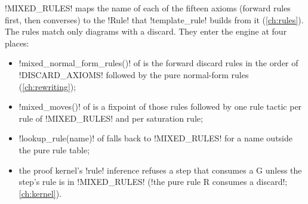 \py!MIXED_RULES! maps the name of each of the fifteen axioms (forward rules first, then converses) to the \py!Rule! that \py!template_rule! builds from it (\cref{ch:rules}). The rules match only diagrams with a discard. They enter the engine at four places:
\begin{itemize}
\item \py!mixed_normal_form_rules()! of  is the forward discard rules in the order of \py!DISCARD_AXIOMS! followed by the pure normal-form rules (\cref{ch:rewriting});
\item \py!mixed_moves()! of  is a fixpoint of those rules followed by one rule tactic per rule of \py!MIXED_RULES! and per saturation rule;
\item \py!lookup_rule(name)! of  falls back to \py!MIXED_RULES! for a name outside the pure rule table;
\item the proof kernel's \py!rule! inference refuses a step that consumes a G unless the step's rule is in \py!MIXED_RULES! (\code!the pure rule R consumes a discard!; \cref{ch:kernel}).
\end{itemize}
